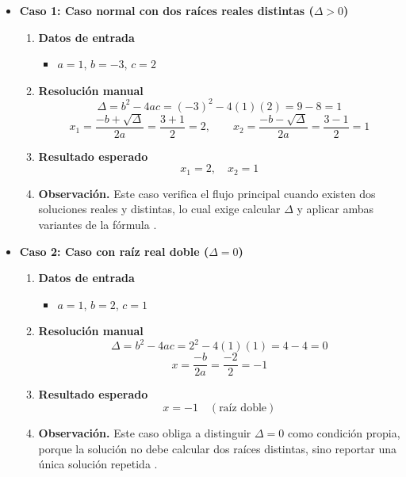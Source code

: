 \documentclass[12pt,twoside]{book}
\begin{document}
						\begin{itemize}
							\item \textbf{Caso 1: Caso normal con dos raíces reales distintas ($\Delta>0$)}
							
							\begin{enumerate}
								\item \textbf{Datos de entrada}
								\begin{itemize}
									\item $a=1$, $b=-3$, $c=2$
								\end{itemize}
								\item \textbf{Resolución manual}
								\[
								\Delta=b^2-4ac=(-3)^2-4(1)(2)=9-8=1
								\]
								\[
								x_1=\frac{-b+\sqrt{\Delta}}{2a}=\frac{3+1}{2}=2,
								\qquad
								x_2=\frac{-b-\sqrt{\Delta}}{2a}=\frac{3-1}{2}=1
								\]
								\item \textbf{Resultado esperado}
								\[
								x_1=2,\quad x_2=1
								\]
								\item \textbf{Observación.} Este caso verifica el flujo principal cuando existen dos soluciones reales y distintas, lo cual exige calcular $\Delta$ y aplicar ambas variantes de la fórmula \cite{Joyanes2007Fundamentos}.
							\end{enumerate}
							
							\item \textbf{Caso 2: Caso con raíz real doble ($\Delta=0$)}
							
							\begin{enumerate}
								\item \textbf{Datos de entrada}
								\begin{itemize}
									\item $a=1$, $b=2$, $c=1$
								\end{itemize}
								\item \textbf{Resolución manual}
								\[
								\Delta=b^2-4ac=2^2-4(1)(1)=4-4=0
								\]
								\[
								x=\frac{-b}{2a}=\frac{-2}{2}=-1
								\]
								\item \textbf{Resultado esperado}
								\[
								x=-1 \quad (\text{raíz doble})
								\]
								\item \textbf{Observación.} Este caso obliga a distinguir $\Delta=0$ como condición propia, porque la solución no debe calcular dos raíces distintas, sino reportar una única solución repetida \cite{Farrell2018Programming}.
							\end{enumerate}
							

\end{itemize}
\end{document}
